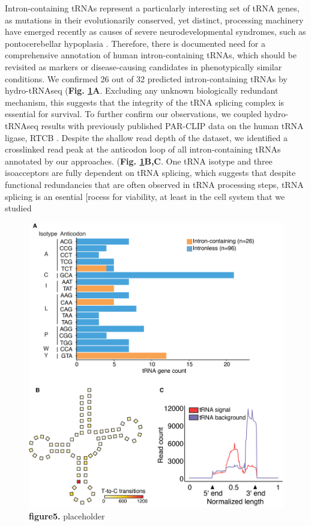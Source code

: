 \documentclass[12pt]{rockefeller}
\begin{document}
Intron-containing tRNAs represent a particularly interesting set of tRNA genes, as mutations in their evolutionarily conserved, yet distinct, processing machinery have emerged recently as causes of severe neurodevelopmental syndromes, such as pontocerebellar hypoplasia \cite{Namavar:2011ew}. Therefore, there is documented need for a comprehensive annotation of human intron-containing tRNAs, which should be revisited as markers or disease-causing candidates in phenotypically similar conditions. We confirmed 26 out of 32 predicted intron-containing tRNAs by hydro-tRNAseq (\textbf{Fig. \ref{paper5}A}. Excluding any unknown biologically redundant mechanism, this suggests that the integrity of the tRNA splicing complex is essential for survival. To further confirm our observations, we coupled hydro-tRNAseq results with previously published PAR-CLIP data on the human tRNA ligase, RTCB \cite{Baltz:2012bh}. Despite the shallow read depth of the dataset, we identified a crosslinked read peak at the anticodon loop of all intron-containing tRNAs annotated by our approaches. (\textbf{Fig. \ref{paper5}B,C}. One tRNA isotype and three isoacceptors are fully dependent on tRNA splicing, which suggests that despite functional redundancies that are often observed in tRNA processing steps, tRNA splicing is an esential [rocess for viability, at least in the cell system that we studied 

\begin{figure}[!ht]%
\centering
\includegraphics[width=\textwidth]{paper5.png}%
\caption[figure5]
{\textbf{figure5.}
placeholder}
\centering
\label{paper5}%
\end{figure}
\end{document}
